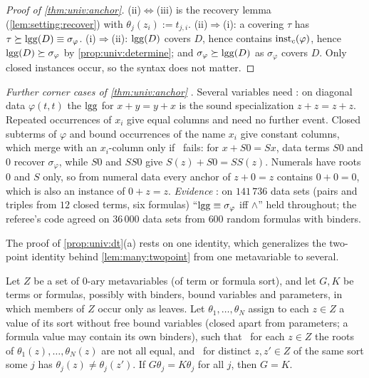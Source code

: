 \begin{proof}[Proof of \cref{thm:univ:anchor}]
(ii)$\Leftrightarrow$(iii) is the recovery lemma (\cref{lem:setting:recover}) with $\theta_j(z_i):=t_{j,i}$. (ii)$\Rightarrow$(i): a covering $\tau$ has $\tau\succeq\mathrm{lgg}(D)\equiv\sigma_\varphi$. (i)$\Rightarrow$(ii): $\mathrm{lgg}(D)$ covers $D$, hence contains $\mathrm{inst}_{c}(\varphi)$, hence $\mathrm{lgg}(D)\succeq\sigma_\varphi$ by \cref{prop:univ:determine}; and $\sigma_\varphi\succeq\mathrm{lgg}(D)$ as $\sigma_\varphi$ covers $D$. Only closed instances occur, so the syntax does not matter.
\end{proof}

\emph{Further corner cases of \cref{thm:univ:anchor}} . Several variables need \evD: on diagonal data $\varphi(t,t)$ the $\mathrm{lgg}$ for $x+y=y+x$ is the sound specialization $z+z=z+z$. Repeated occurrences of $x_i$ give equal columns and need no further event. Closed subterms of $\varphi$ and bound occurrences of the name $x_i$ give constant columns, which merge with an $x_i$-column only if \evR\ fails: for $x+S0=Sx$, data terms $S0$ and $0$ recover $\sigma_\varphi$, while $S0$ and $SS0$ give $S(z)+S0=SS(z)$. Numerals have roots $0$ and $S$ only, so from numeral data every anchor of $z+0=z$ contains $0+0=0$, which is also an instance of $0+z=z$.
\emph{Evidence} : on $141\,736$ data sets (pairs and triples from $12$ closed terms, six formulas) ``$\mathrm{lgg}\equiv\sigma_\varphi$ iff \evR$\wedge$\evD'' held throughout; the referee's code agreed on $36\,000$ data sets from $600$ random formulas with binders.

The proof of \cref{prop:univ:dt}(a) rests on one identity, which generalizes the two-point identity behind \cref{lem:many:twopoint}  from one metavariable to several.

\begin{lemma}\label{lem:univ:identity}
Let $Z$ be a set of $0$-ary metavariables (of term or formula sort), and let $G,K$ be terms or formulas, possibly with binders, bound variables and parameters, in which members of $Z$ occur only as leaves. Let $\theta_1,\dots,\theta_N$ assign to each $z\in Z$ a value of its sort without free bound variables (closed apart from parameters; a formula value may contain its own binders), such that \evR\ for each $z\in Z$ the roots of $\theta_1(z),\dots,\theta_N(z)$ are not all equal, and \evD\ for distinct $z,z'\in Z$ of the same sort some $j$ has $\theta_j(z)\neq\theta_j(z')$. If $G\theta_j=K\theta_j$ for all $j$, then $G=K$.
\end{lemma}

